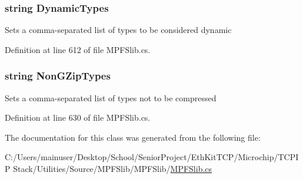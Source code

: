 \subsubsection[{Dynamic\+Types}]{\setlength{\rightskip}{0pt plus 5cm}string Dynamic\+Types\hspace{0.3cm}{\ttfamily [set]}}\label{class_microchip_1_1_m_p_f_s2_builder_a4e01762bbf2bbd233520d12c78884456}


Sets a comma-\/separated list of types to be considered dynamic 



Definition at line 612 of file M\+P\+F\+Slib.\+cs.

\hypertarget{class_microchip_1_1_m_p_f_s2_builder_a2de0222dd4787420fc8ebfb15495bf0d}{}
\subsubsection[{Non\+G\+Zip\+Types}]{\setlength{\rightskip}{0pt plus 5cm}string Non\+G\+Zip\+Types\hspace{0.3cm}{\ttfamily [set]}}\label{class_microchip_1_1_m_p_f_s2_builder_a2de0222dd4787420fc8ebfb15495bf0d}


Sets a comma-\/separated list of types not to be compressed 



Definition at line 630 of file M\+P\+F\+Slib.\+cs.



The documentation for this class was generated from the following file\+:\begin{DoxyCompactItemize}
\item 
C\+:/\+Users/mainuser/\+Desktop/\+School/\+Senior\+Project/\+Eth\+Kit\+T\+C\+P/\+Microchip/\+T\+C\+P\+I\+P Stack/\+Utilities/\+Source/\+M\+P\+F\+Slib/\+M\+P\+F\+Slib/\hyperlink{_m_p_f_slib_8cs}{M\+P\+F\+Slib.\+cs}\end{DoxyCompactItemize}
